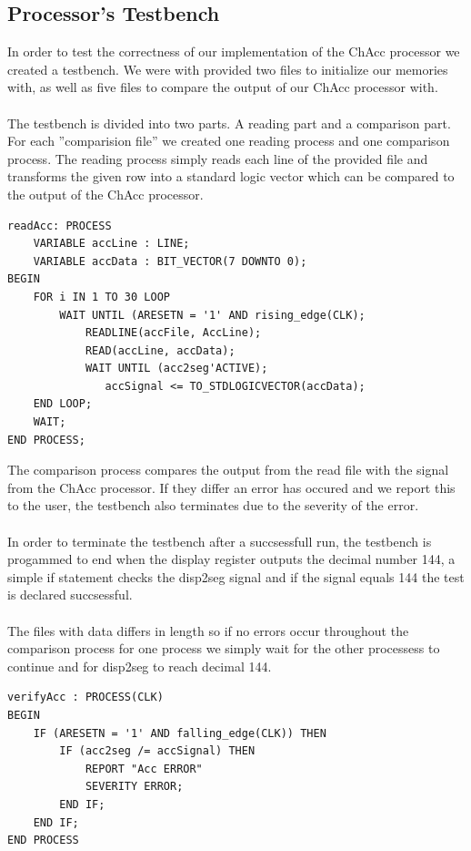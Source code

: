 \documentclass[a4paper,11pt]{article}
\begin{document}
\subsection{Processor's Testbench}
In order to test the correctness of our implementation of the ChAcc processor 
we created a testbench. We were with provided two files to initialize our 
memories with, as well as five files to compare the output of our ChAcc 
processor with.\\\\
\noindent
The testbench is divided into two parts. A reading part and a comparison part. 
For each ''comparision file'' we created one reading 
process and one comparison process. The reading process simply reads each 
line of the provided file and transforms the given row into a standard 
logic vector which can be compared to the output of the ChAcc processor.\\

\begin{lstlisting}[frame=single]
readAcc: PROCESS
    VARIABLE accLine : LINE;
    VARIABLE accData : BIT_VECTOR(7 DOWNTO 0);
BEGIN
    FOR i IN 1 TO 30 LOOP
        WAIT UNTIL (ARESETN = '1' AND rising_edge(CLK);
            READLINE(accFile, AccLine);
            READ(accLine, accData);
            WAIT UNTIL (acc2seg'ACTIVE);
               accSignal <= TO_STDLOGICVECTOR(accData);
    END LOOP;
    WAIT;
END PROCESS;
\end{lstlisting}

\noindent
The comparison process compares the output from the read file with the signal 
from the ChAcc processor. If they differ an error has occured and we report 
this to the user, the testbench also terminates due to the severity of the 
error.\\\\
\noindent
In order to terminate the testbench after a succsessfull run, the testbench 
is progammed to end when the display register outputs the decimal number 144, 
a simple if statement checks the disp2seg signal and if the signal equals 144 
the test is declared succsessful.\\\\
\noindent
The files with data differs in length so if no errors occur throughout 
the comparison process for one process we simply wait for the other 
processess to continue and for disp2seg to reach decimal 144.\\

\begin{lstlisting}[frame=single]
verifyAcc : PROCESS(CLK)
BEGIN
    IF (ARESETN = '1' AND falling_edge(CLK)) THEN
        IF (acc2seg /= accSignal) THEN
            REPORT "Acc ERROR"
            SEVERITY ERROR;
        END IF;
    END IF;
END PROCESS
\end{lstlisting}
\end{document}

